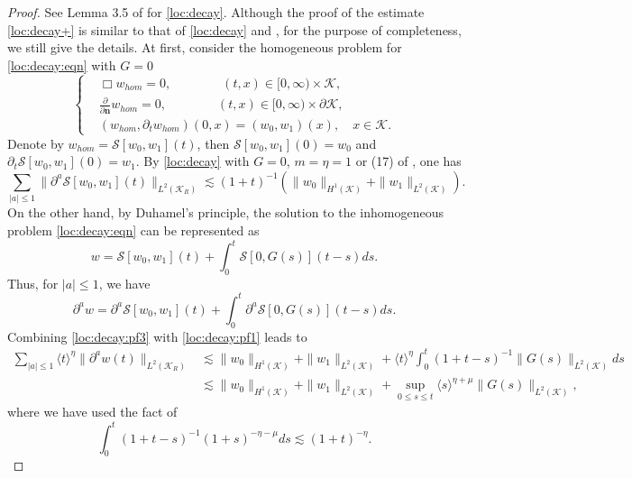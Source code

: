 \documentclass[11pt,twoside]{article}
\def\cK{\mathcal K}
\def\cS{\mathcal S}
\def\p{\partial}
\def\ls{\lesssim}
\def\bn{\mathbf{n}}
\newcommand{\w}[1]{\langle {#1} \rangle}
\theoremstyle{plain}
\theoremstyle{definition}
\numberwithin{equation}{section}
\begin{document}
\begin{proof}
See Lemma 3.5 of \cite{Kubo13} for \eqref{loc:decay}.
Although the proof of the estimate \eqref{loc:decay+} is similar to that of \eqref{loc:decay} and \cite[Lemma 3.2]{Kubo14},
for the purpose of completeness, we still give the details.
At first, consider the homogeneous problem for \eqref{loc:decay:eqn} with $G=0$
\begin{equation*}
\left\{
\begin{aligned}
&\Box w_{hom}=0,\qquad\qquad (t,x)\in[0,\infty)\times\cK,\\
&\frac{\p}{\p\bn}w_{hom}=0,\qquad\qquad (t,x)\in[0,\infty)\times\p\cK,\\
&(w_{hom},\p_tw_{hom})(0,x)=(w_0,w_1)(x),\quad x\in\cK.
\end{aligned}
\right.
\end{equation*}
Denote by $w_{hom}=\cS[w_0,w_1](t)$, then $\cS[w_0,w_1](0)=w_0$ and $\p_t\cS[w_0,w_1](0)=w_1$.
By \eqref{loc:decay} with $G=0$, $m=\eta=1$ or (17) of \cite{Kubo13}, one has
\begin{equation}\label{loc:decay:pf1}
\sum_{|a|\le 1}\|\p^a\cS[w_0,w_1](t)\|_{L^2(\cK_R)}
\ls(1+t)^{-1}(\|w_0\|_{H^{1}(\cK)}+\|w_1\|_{L^2(\cK)}).
\end{equation}
On the other hand, by Duhamel's principle, the solution to the inhomogeneous problem \eqref{loc:decay:eqn} can be represented as
\begin{equation}\label{loc:decay:pf2}
w=\cS[w_0,w_1](t)+\int_0^t\cS[0,G(s)](t-s)ds.
\end{equation}
Thus, for $|a|\le1$, we have
\begin{equation}\label{loc:decay:pf3}
\p^aw=\p^a\cS[w_0,w_1](t)+\int_0^t\p^a\cS[0,G(s)](t-s)ds.
\end{equation}
Combining \eqref{loc:decay:pf3} with \eqref{loc:decay:pf1} leads to
\begin{equation}\label{loc:decay:pf4}
\begin{split}
\sum_{|a|\le 1}\w{t}^{\eta}\|\p^aw(t)\|_{L^2(\cK_R)}
&\ls\|w_0\|_{H^{1}(\cK)}+\|w_1\|_{L^2(\cK)}+\w{t}^{\eta}\int_0^t(1+t-s)^{-1}\|G(s)\|_{L^2(\cK)}ds\\
&\ls\|w_0\|_{H^{1}(\cK)}+\|w_1\|_{L^2(\cK)}+\sup_{0\le s\le t}\w{s}^{\eta+\mu}\|G(s)\|_{L^2(\cK)},
\end{split}
\end{equation}
where we have used the fact of
\begin{equation*}
\int_0^t(1+t-s)^{-1}(1+s)^{-\eta-\mu}ds\ls(1+t)^{-\eta}.
\end{equation*}

\end{proof}
\end{document}
